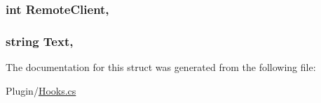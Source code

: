 \subsubsection[{Remote\+Client}]{\setlength{\rightskip}{0pt plus 5cm}int Remote\+Client\hspace{0.3cm}{\ttfamily [get]}, {\ttfamily [set]}}\label{structOTA_1_1Plugin_1_1HookArgs_1_1UnkownSendPacket_a40759627b2a827508158b451d3b720e1}
\hypertarget{structOTA_1_1Plugin_1_1HookArgs_1_1UnkownSendPacket_ab4726c7c06ae41233e679361293b4173}{}
\subsubsection[{Text}]{\setlength{\rightskip}{0pt plus 5cm}string Text\hspace{0.3cm}{\ttfamily [get]}, {\ttfamily [set]}}\label{structOTA_1_1Plugin_1_1HookArgs_1_1UnkownSendPacket_ab4726c7c06ae41233e679361293b4173}


The documentation for this struct was generated from the following file\+:\begin{DoxyCompactItemize}
\item 
Plugin/\hyperlink{Hooks_8cs}{Hooks.\+cs}\end{DoxyCompactItemize}
